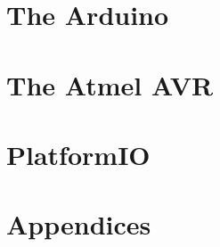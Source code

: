 \frontmatter






\mainmatter

\part{The Arduino}



\part{The Atmel AVR}

\part{PlatformIO}


\backmatter

\part{Appendices}

